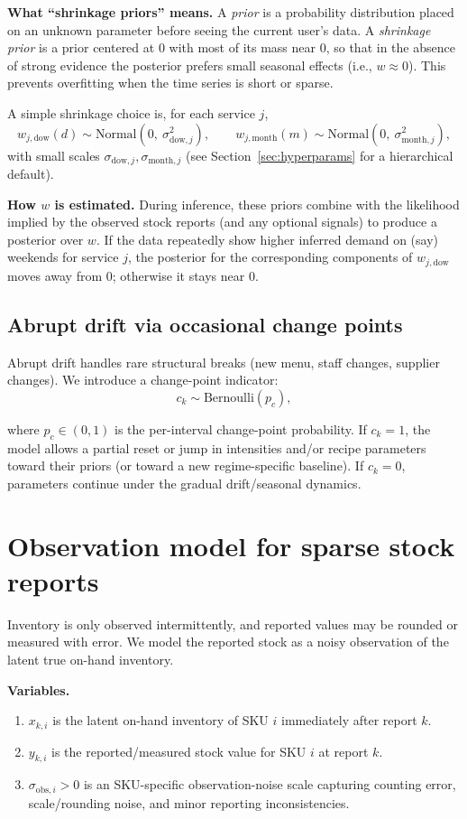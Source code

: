 \documentclass[11pt]{article}
\begin{document}
\textbf{What ``shrinkage priors'' means.} A \emph{prior} is a probability distribution placed on an unknown parameter before seeing the current user's data.
A \emph{shrinkage prior} is a prior centered at 0 with most of its mass near 0, so that in the absence of strong evidence the posterior prefers small seasonal effects (i.e., $w\approx 0$).
This prevents overfitting when the time series is short or sparse.

A simple shrinkage choice is, for each service $j$,
\[
  w_{j,\text{dow}}(d) \sim \text{Normal}(0,\ \sigma^2_{\text{dow},j}),\qquad
  w_{j,\text{month}}(m) \sim \text{Normal}(0,\ \sigma^2_{\text{month},j}),
\]
with small scales $\sigma_{\text{dow},j},\sigma_{\text{month},j}$ (see Section~\ref{sec:hyperparams} for a hierarchical default).

\textbf{How $w$ is estimated.} During inference, these priors combine with the likelihood implied by the observed stock reports (and any optional signals) to produce a posterior over $w$.
If the data repeatedly show higher inferred demand on (say) weekends for service $j$, the posterior for the corresponding components of $w_{j,\text{dow}}$ moves away from 0; otherwise it stays near 0.

\subsection{Abrupt drift via occasional change points}

Abrupt drift handles rare structural breaks (new menu, staff changes, supplier changes).
We introduce a change-point indicator:
\[
  c_k \sim \text{Bernoulli}(p_c),
\]

where $p_c\in(0,1)$ is the per-interval change-point probability.
If $c_k = 1$, the model allows a partial reset or jump in intensities and/or recipe parameters toward their priors (or toward a new regime-specific baseline).
If $c_k = 0$, parameters continue under the gradual drift/seasonal dynamics.

\section{Observation model for sparse stock reports}

Inventory is only observed intermittently, and reported values may be rounded or measured with error.
We model the reported stock as a noisy observation of the latent true on-hand inventory.

\textbf{Variables.}
\begin{enumerate}
  \item $x_{k,i}$ is the latent on-hand inventory of SKU $i$ immediately after report $k$.
  \item $y_{k,i}$ is the reported/measured stock value for SKU $i$ at report $k$.
  \item $\sigma_{\text{obs},i}>0$ is an SKU-specific observation-noise scale capturing counting error, scale/rounding noise, and minor reporting inconsistencies.
\end{enumerate}
\end{document}
